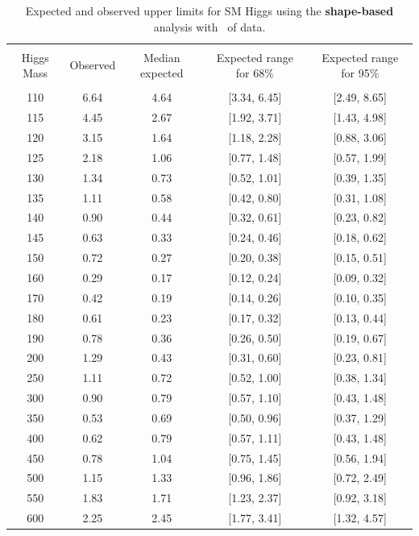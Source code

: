 \begin{table}[hbp!]
\begin{center}
\begin{tabular}{c c c c c}
\hline
\vspace{-3mm} && \\
 Higgs Mass & Observed  & Median expected & Expected range for 68\% & Expected range for 95\%   \\
\vspace{-3mm} && \\
\hline
110 & 6.64 & 4.64 & [3.34, 6.45] & [2.49, 8.65] \\
115 & 4.45 & 2.67 & [1.92, 3.71] & [1.43, 4.98] \\
120 & 3.15 & 1.64 & [1.18, 2.28] & [0.88, 3.06] \\
125 & 2.18 & 1.06 & [0.77, 1.48] & [0.57, 1.99] \\
130 & 1.34 & 0.73 & [0.52, 1.01] & [0.39, 1.35] \\
135 & 1.11 & 0.58 & [0.42, 0.80] & [0.31, 1.08] \\
140 & 0.90 & 0.44 & [0.32, 0.61] & [0.23, 0.82] \\
145 & 0.63 & 0.33 & [0.24, 0.46] & [0.18, 0.62] \\
150 & 0.72 & 0.27 & [0.20, 0.38] & [0.15, 0.51] \\
160 & 0.29 & 0.17 & [0.12, 0.24] & [0.09, 0.32] \\
170 & 0.42 & 0.19 & [0.14, 0.26] & [0.10, 0.35] \\
180 & 0.61 & 0.23 & [0.17, 0.32] & [0.13, 0.44] \\
190 & 0.78 & 0.36 & [0.26, 0.50] & [0.19, 0.67] \\
200 & 1.29 & 0.43 & [0.31, 0.60] & [0.23, 0.81] \\
250 & 1.11 & 0.72 & [0.52, 1.00] & [0.38, 1.34] \\
300 & 0.90 & 0.79 & [0.57, 1.10] & [0.43, 1.48] \\
350 & 0.53 & 0.69 & [0.50, 0.96] & [0.37, 1.29] \\
400 & 0.62 & 0.79 & [0.57, 1.11] & [0.43, 1.48] \\
450 & 0.78 & 1.04 & [0.75, 1.45] & [0.56, 1.94] \\
500 & 1.15 & 1.33 & [0.96, 1.86] & [0.72, 2.49] \\
550 & 1.83 & 1.71 & [1.23, 2.37] & [0.92, 3.18] \\
600 & 2.25 & 2.45 & [1.77, 3.41] & [1.32, 4.57] \\
\hline
\end{tabular}
\caption{Expected and observed upper limits for SM Higgs using the
  {\bf shape-based} analysis with \intlumiEightTeV\ of data.}
\label{tab:mvabase_uls}
\end{center}
\end{table}
